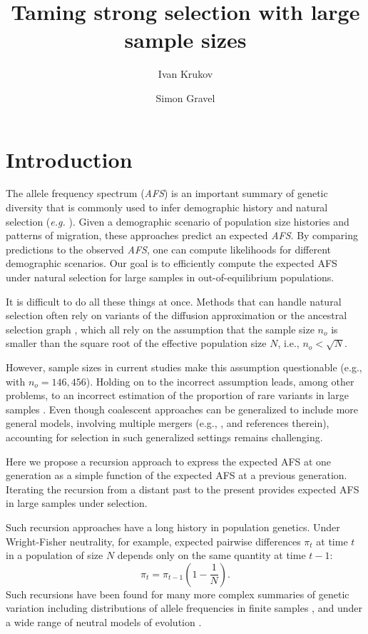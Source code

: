 \documentclass[9pt,twocolumn,twoside,lineno]{gsajnl}
\title{ Taming strong selection with large sample sizes }
\author[$\ast$]{Ivan Krukov}
\author[$\ast$]{Simon Gravel}
\affil[$\ast$]{Genome Center, Department of Human Genetics, McGill University, Montreal, Canada}
\begin{document}
\maketitle
\thispagestyle{firststyle}
\marginmark
\firstpagefootnote

\section{Introduction}
\label{sec_introduciton}

The allele frequency spectrum (\textit{AFS}) is an important summary of genetic diversity that is
commonly used to infer demographic history and natural selection (\textit{e.g.}
\cite{GutenkunstEtAl2009, KammEtAl2017, JouganousEtAl2017}). Given a demographic scenario of
population size histories and patterns of migration, these approaches predict an expected \textit{AFS}. By comparing
predictions to the observed \textit{AFS}, one can compute likelihoods for different demographic
scenarios. Our goal is to efficiently compute the expected AFS under natural selection for large samples in out-of-equilibrium populations.  

It is difficult to do all these things at once. Methods that can handle natural selection often rely on variants of the diffusion approximation  \citep{EyreWalker2006, BoykoEtAl2008, GutenkunstEtAl2009, JouganousEtAl2017} or the ancestral selection graph \cite{KroneNeuhauser1997}, which all rely on the assumption that the sample size $n_o$ is smaller than the square root of the effective population size $N$, i.e., $n_o < \sqrt{N}.$  

However, sample sizes in current studies make this assumption questionable (e.g., \citep{karczewski2020mutational} with $n_o=146,456$). Holding on to the incorrect assumption leads, among other problems, to an incorrect estimation of the proportion of rare variants in large samples \citep{Fu2006, BhaskarEtAl2014}. 
Even though coalescent approaches can be generalized to include more general models, involving multiple mergers (e.g., \cite{Fu2006, Spence2016}, and references therein), accounting for selection in such generalized settings remains challenging.

Here we propose a recursion approach to express the expected AFS at one generation as a simple function of the expected AFS at a previous generation. Iterating the recursion from a distant past to the present provides expected AFS in large samples under selection. 

Such recursion approaches have a long history in population genetics. Under Wright-Fisher neutrality, for example, expected pairwise differences $\pi_t$ at time $t$ in a population of size $N$ depends only on the same quantity at time $t-1$: 
$$\pi_t = \pi_{t-1} \left(1-\frac{1}{N}\right).$$ 
Such recursions have been found for many more complex summaries of genetic variation including distributions of allele frequencies in finite samples \cite{JouganousEtAl2017, evans2007non}, and under a wide range of neutral models of evolution \cite{Lessard2010}. 
\end{document}
